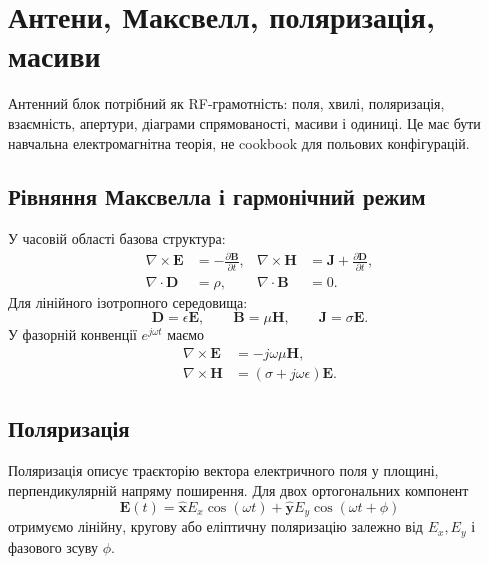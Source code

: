\chapter{Антени, Максвелл, поляризація, масиви}
\label{chap:antenna-session07}


Антенний блок потрібний як RF-грамотність: поля, хвилі, поляризація, взаємність, апертури, діаграми спрямованості, масиви і одиниці. Це має бути навчальна електромагнітна теорія, не cookbook для польових конфігурацій.

\section{Рівняння Максвелла і гармонічний режим}

У часовій області базова структура:
\begin{align}
  \nabla\times \mathbf{E} &= -\frac{\partial \mathbf{B}}{\partial t}, &
  \nabla\times \mathbf{H} &= \mathbf{J}+\frac{\partial \mathbf{D}}{\partial t},\\
  \nabla\cdot \mathbf{D} &= \rho, &
  \nabla\cdot \mathbf{B} &= 0.
\end{align}
Для лінійного ізотропного середовища:
\begin{equation}
  \mathbf{D}=\epsilon \mathbf{E},\qquad \mathbf{B}=\mu \mathbf{H},\qquad \mathbf{J}=\sigma\mathbf{E}.
\end{equation}
У фазорній конвенції $e^{j\omega t}$ маємо
\begin{align}
  \nabla\times \mathbf{E} &= -j\omega\mu\mathbf{H},\\
  \nabla\times \mathbf{H} &= (\sigma+j\omega\epsilon)\mathbf{E}.
\end{align}

\section{Поляризація}

Поляризація описує траєкторію вектора електричного поля у площині, перпендикулярній напряму поширення. Для двох ортогональних компонент
\begin{equation}
  \mathbf{E}(t)=\hat{\mathbf{x}}E_x\cos(\omega t)+\hat{\mathbf{y}}E_y\cos(\omega t+\phi)
\end{equation}
отримуємо лінійну, кругову або еліптичну поляризацію залежно від $E_x,E_y$ і фазового зсуву $\phi$.

